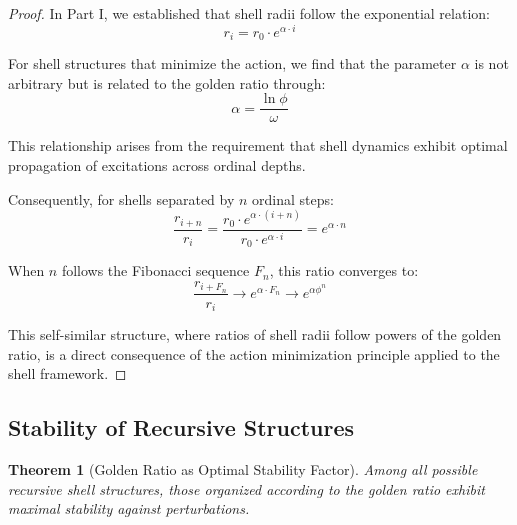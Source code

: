 \documentclass[12pt,a4paper]{article}
\newtheorem{theorem}{Theorem}[section]
\begin{document}
\begin{proof}
    In Part I, we established that shell radii follow the exponential relation:
    \begin{equation}
    r_i = r_0 \cdot e^{\alpha \cdot i}
    \end{equation}
    
    For shell structures that minimize the action, we find that the parameter $\alpha$ is not arbitrary but is related to the golden ratio through:
    \begin{equation}
    \alpha = \frac{\ln \phi}{\omega}
    \end{equation}
    
    This relationship arises from the requirement that shell dynamics exhibit optimal propagation of excitations across ordinal depths.
    
    Consequently, for shells separated by $n$ ordinal steps:
    \begin{equation}
    \frac{r_{i+n}}{r_i} = \frac{r_0 \cdot e^{\alpha \cdot (i+n)}}{r_0 \cdot e^{\alpha \cdot i}} = e^{\alpha \cdot n}
    \end{equation}
    
    When $n$ follows the Fibonacci sequence $F_n$, this ratio converges to:
    \begin{equation}
    \frac{r_{i+F_n}}{r_i} \to e^{\alpha \cdot F_n} \to e^{\alpha \phi^n}
    \end{equation}
    
    This self-similar structure, where ratios of shell radii follow powers of the golden ratio, is a direct consequence of the action minimization principle applied to the shell framework.
    \end{proof}
    
    \subsection{Stability of Recursive Structures}
    \label{subsec:stability-recursive}
    
    \begin{theorem}[Golden Ratio as Optimal Stability Factor]
    \label{thm:stability-factor}
    Among all possible recursive shell structures, those organized according to the golden ratio exhibit maximal stability against perturbations.
    \end{theorem}
    
\end{document}
